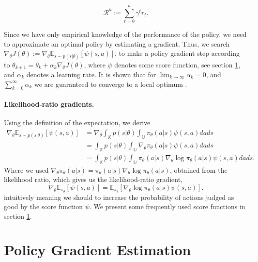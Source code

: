 \begin{equation}
  \mathcal{R}^h := \sum_{t=0}^{h} \gamma^t r_t.
  \label{eqn:acc-reward}
\end{equation}

Since we have only empirical knowledge of the performance of the policy, we need to approximate an optimal policy by estimating a gradient. Thus, we search $\nabla_\theta J(\theta) := \nabla_\theta \mathbb{E}_{s\sim p(s|\theta)}\left[\psi(s,a)\right]$, to make a policy gradient step according to $\theta_{k+1} = \theta_k + \alpha_k \nabla_\theta J(\theta)$, where $\psi$ denotes some score function, see section \ref{sec:pge}, and $\alpha_k$ denotes a learning rate. It is shown that for $\lim_{k\to\infty}\alpha_k = 0$, and $\sum_{k=0}^\infty \alpha_k$ we are guaranteed to converge to a local optimum \cite{Sutton:1999:PGM:3009657.3009806}.

\paragraph{Likelihood-ratio gradients.} Using the definition of the expectation, we derive
\begin{align*}
  \nabla_\theta \mathbb{E}_{s\sim p(s|\theta)}\left[\psi(s,a)\right] &= \nabla_\theta \int_\mathbb{X}{p(s|\theta)\int_\mathbb{U}{\pi_\theta(a|s)\psi(s,a) da}ds} \\
  &= \int_\mathbb{X}{p(s|\theta)\int_\mathbb{U}{\nabla_\theta {\pi_\theta(a|s)} \psi(s,a) da}ds} \\
  &= \int_\mathbb{X}{p(s|\theta)\int_\mathbb{U}{\pi_\theta(a|s)\nabla_\theta{\log\pi_\theta(a|s)} \psi(s,a) da}ds} .
\end{align*}
Where we used $\nabla_\theta \pi_\theta(a|s) = \pi_\theta(a|s)\nabla_\theta\log\pi_\theta(a|s)$, obtained from the likelihood ratio, which gives us the likelihood-ratio gradient,
\begin{equation}
  \nabla_\theta \mathbb{E}_{\pi_\theta}\left[\psi(s,a)\right] = \mathbb{E}_{\pi_\theta}\left[\nabla_\theta{\log\pi_\theta(a|s)}\psi(s,a)\right].
  \label{eqn:like-grad}
\end{equation}
intuitively meaning we should to increase the probability of actions judged as good by the score function $\psi$. We present some frequently used score functions in section \ref{sec:pge}.

\section{Policy Gradient Estimation}
\label{sec:pge}

